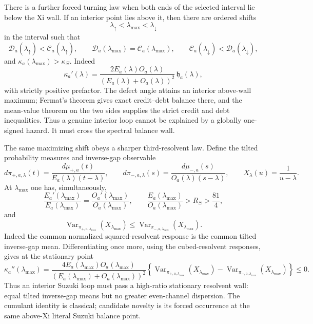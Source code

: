 \documentclass[11pt]{article}
\theoremstyle{definition}
\theoremstyle{remark}
\begin{document}
There is a further forced turning law when both ends of the selected interval lie below the Xi
wall.  If an interior point lies above it, then there are ordered shifts
\[
 \lambda_\uparrow<\lambda_{\max}<\lambda_\downarrow
\]
in the interval such that
\[
 \mathcal D_a(\lambda_\uparrow)<\mathcal C_a(\lambda_\uparrow),\qquad
 \mathcal D_a(\lambda_{\max})=\mathcal C_a(\lambda_{\max}),\qquad
 \mathcal C_a(\lambda_\downarrow)<\mathcal D_a(\lambda_\downarrow),
\]
and $\kappa_a(\lambda_{\max})>\kappa_\Xi$.  Indeed
\[
 \kappa_a'(\lambda)
 =
 \frac{2E_a(\lambda)O_a(\lambda)}
      {(E_a(\lambda)+O_a(\lambda))^2}\,
 \mathfrak h_a(\lambda),
\]
with strictly positive prefactor.  The defect angle attains an interior above-wall maximum;
Fermat's theorem gives exact credit--debt balance there, and the mean-value theorem on the two
sides supplies the strict credit and debt inequalities.  Thus a genuine interior loop cannot be
explained by a globally one-signed hazard.  It must cross the spectral balance wall.

The same maximizing shift obeys a sharper third-resolvent law.  Define the tilted probability
measures and inverse-gap observable
\[
 d\pi_{+,a,\lambda}(t)
 =\frac{d\mu_{+,a}(t)}
        {E_a(\lambda)(t-\lambda)},\qquad
 d\pi_{-,a,\lambda}(s)
 =\frac{d\mu_{-,a}(s)}
        {O_a(\lambda)(s-\lambda)},\qquad
 X_\lambda(u)=\frac1{u-\lambda}.
\]
At $\lambda_{\max}$ one has, simultaneously,
\[
 \frac{E_a'(\lambda_{\max})}{E_a(\lambda_{\max})}
 =
 \frac{O_a'(\lambda_{\max})}{O_a(\lambda_{\max})},
 \qquad
 \frac{E_a(\lambda_{\max})}{O_a(\lambda_{\max})}
 >R_\Xi>\frac{81}{4},
\]
and
\[
 \operatorname{Var}_{\pi_{+,a,\lambda_{\max}}}(X_{\lambda_{\max}})
 \leq
 \operatorname{Var}_{\pi_{-,a,\lambda_{\max}}}(X_{\lambda_{\max}}).
\]
Indeed the common normalized squared-resolvent response is the common tilted inverse-gap mean.
Differentiating once more, using the cubed-resolvent responses, gives at the stationary point
\[
 \kappa_a''(\lambda_{\max})
 =
 \frac{4E_a(\lambda_{\max})O_a(\lambda_{\max})}
      {(E_a(\lambda_{\max})+O_a(\lambda_{\max}))^2}
 \left\{
 \operatorname{Var}_{\pi_{+,a,\lambda_{\max}}}(X_{\lambda_{\max}})
 -
 \operatorname{Var}_{\pi_{-,a,\lambda_{\max}}}(X_{\lambda_{\max}})
 \right\}\leq0.
\]
Thus an interior Suzuki loop must pass a high-ratio stationary resolvent wall: equal tilted
inverse-gap means but no greater even-channel dispersion.  The cumulant identity is classical;
candidate novelty is its forced occurrence at the same above-Xi literal Suzuki balance point.
\end{document}

